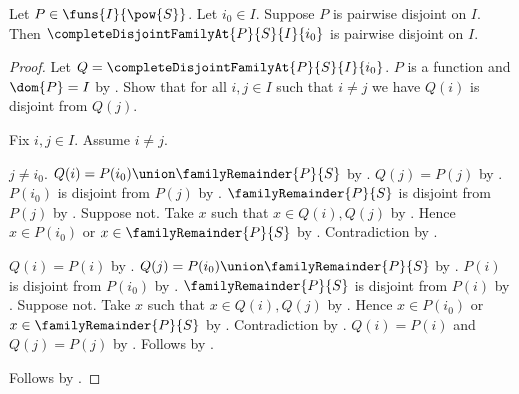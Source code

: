 \begin{proposition}\label{complete_disjoint_family_at_pairwise}
    Let $P\in\funs{I}{\pow{S}}$.
    Let $i_0\in I$.
    Suppose $P$ is pairwise disjoint on $I$.
    Then $\completeDisjointFamilyAt{P}{S}{I}{i_0}$
        is pairwise disjoint on $I$.
\end{proposition}
\begin{proof}
    Let $Q=\completeDisjointFamilyAt{P}{S}{I}{i_0}$.
    $P$ is a function and $\dom{P}=I$
        by .
    Show that for all $i,j\in I$ such that $i\neq j$
        we have $Q(i)$ is disjoint from $Q(j)$.
    \begin{subproof}
        Fix $i,j\in I$.
        Assume $i\neq j$.
        \begin{byCase}
            $j\neq i_0$.
            $Q(i)=P(i_0)\union\familyRemainder{P}{S}$
                by .
            $Q(j)=P(j)$
                by .
            $P(i_0)$ is disjoint from $P(j)$
                by .
            $\familyRemainder{P}{S}$ is disjoint from $P(j)$
                by .
            Suppose not.
            Take $x$ such that $x\in Q(i),Q(j)$ by .
            Hence $x\in P(i_0)$ or $x\in\familyRemainder{P}{S}$
                by .
            Contradiction by .
            \begin{byCase}
                $Q(i)=P(i)$
                    by .
                $Q(j)=P(i_0)\union\familyRemainder{P}{S}$
                    by .
                $P(i)$ is disjoint from $P(i_0)$
                    by .
                $\familyRemainder{P}{S}$ is disjoint from $P(i)$
                    by .
                Suppose not.
                Take $x$ such that $x\in Q(i),Q(j)$ by .
                Hence $x\in P(i_0)$ or
                    $x\in\familyRemainder{P}{S}$ by .
                Contradiction by .
                $Q(i)=P(i)$ and $Q(j)=P(j)$
                    by .
                Follows by .
            \end{byCase}
        \end{byCase}
    \end{subproof}
    Follows by .
\end{proof}

